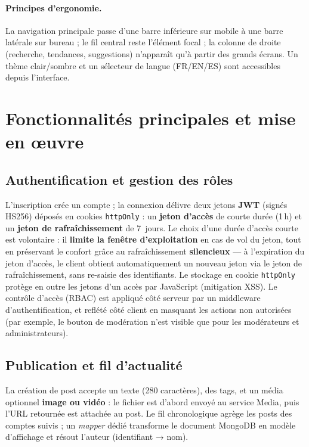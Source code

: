 \paragraph{Principes d'ergonomie.} La navigation principale passe d'une barre
inférieure sur mobile à une barre latérale sur bureau ; le fil central reste
l'élément focal ; la colonne de droite (recherche, tendances, suggestions)
n'apparaît qu'à partir des grands écrans. Un thème clair/sombre et un sélecteur de
langue (FR/EN/ES) sont accessibles depuis l'interface.

\newpage

\section{Fonctionnalités principales et mise en œuvre}

\subsection{Authentification et gestion des rôles}

L'inscription crée un compte ; la connexion délivre deux jetons \textbf{JWT}
(signés HS256) déposés en cookies \texttt{httpOnly} : un \textbf{jeton d'accès}
de courte durée (1\,h) et un \textbf{jeton de rafraîchissement} de 7~jours. Le
choix d'une durée d'accès courte est volontaire : il \textbf{limite la fenêtre
d'exploitation} en cas de vol du jeton, tout en préservant le confort grâce au
rafraîchissement \textbf{silencieux} — à l'expiration du jeton d'accès, le client
obtient automatiquement un nouveau jeton via le jeton de rafraîchissement, sans
re-saisie des identifiants. Le stockage en cookie \texttt{httpOnly} protège en
outre les jetons d'un accès par JavaScript (mitigation XSS). Le contrôle d'accès
(RBAC) est appliqué côté serveur par un middleware d'authentification, et reflété
côté client en masquant les actions non autorisées (par exemple, le bouton de
modération n'est visible que pour les modérateurs et administrateurs).

\subsection{Publication et fil d'actualité}

La création de post accepte un texte (280 caractères), des tags, et un média
optionnel \textbf{image ou vidéo} : le fichier est d'abord envoyé au service Media,
puis l'URL retournée est attachée au post. Le fil chronologique agrège les posts
des comptes suivis ; un \textit{mapper} dédié transforme le document MongoDB en
modèle d'affichage et résout l'auteur (identifiant → nom).

